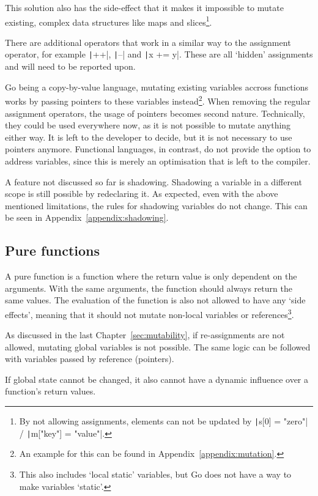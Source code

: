 This solution also has the side-effect that it makes it impossible to mutate
existing, complex data structures like maps and slices\footnote{By not
    allowing assignments, elements can not be updated by
\texttt|s[0] = "zero"| / \texttt|m["key"] = "value"|.}.

There are additional operators that work in a similar way to the assignment
operator, for example \texttt|++|, \texttt|--| and
\texttt|x += y|. These are all `hidden' assignments and will need to
be reported upon.

Go being a \gls{copy-by-value} language, mutating existing variables
accross functions works by passing pointers to these variables instead\footnote{
An example for this can be found in Appendix~\ref{appendix:mutation}.}.
When removing the regular assignment operators, the usage of pointers becomes
second nature. Technically, they could be used everywhere now, as it is not
possible to mutate anything either way. It is left to the developer to decide,
but it is not necessary to use pointers anymore. Functional languages, in contrast,
do not provide the option to address variables, since this is merely an optimisation
that is left to the compiler.

A feature not discussed so far is shadowing. Shadowing a variable in a different
scope is still possible by redeclaring it. As expected, even with the above
mentioned limitations, the rules for shadowing variables do not change. This
can be seen in Appendix~\ref{appendix:shadowing}.

\subsection{Pure functions}

A pure function is a function where the return value is only dependent on
the arguments. With the same arguments, the function should always return
the same values. The evaluation of the function is also not allowed to have
any `side effects', meaning that it should not mutate non-local variables or
references\footnote{This also includes `local static' variables, but Go does
not have a way to make variables `static'.}.

As discussed in the last Chapter~\ref{sec:mutability}, if re-assignments
are not allowed, mutating global variables is not possible. The same logic
can be followed with variables passed by reference (pointers).

If global state cannot be changed, it also cannot have a dynamic influence
over a function's return values.

